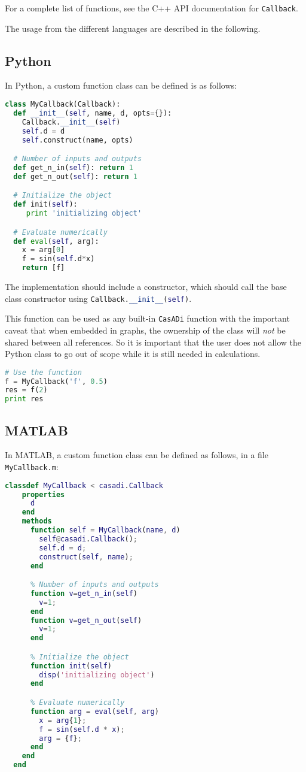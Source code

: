 \documentclass[a4paper,12pt]{book}
\newcommand{\CasADi}{\texttt{CasADi}\xspace}
\begin{document}
For a complete list of functions, see the C++ API documentation for
\texttt{Callback}.

The usage from the different languages are described in the following.

\subsection*{Python}
In Python, a custom function class can be defined is as follows:
\begin{lstlisting}[language=Python]
class MyCallback(Callback):
  def __init__(self, name, d, opts={}):
    Callback.__init__(self)
    self.d = d
    self.construct(name, opts)

  # Number of inputs and outputs
  def get_n_in(self): return 1
  def get_n_out(self): return 1

  # Initialize the object
  def init(self):
     print 'initializing object'

  # Evaluate numerically
  def eval(self, arg):
    x = arg[0]
    f = sin(self.d*x)
    return [f]
\end{lstlisting}

The implementation should include a constructor, which should call the
base class constructor using
\lstinline[language=Python]{Callback.__init__(self)}.

This function can be used as any built-in \CasADi function with the important
caveat that when embedded in graphs, the ownership of the class will \emph{not}
be shared between all references. So it is important that the user does not
allow the Python class to go out of scope while it is still needed in
calculations.

\begin{lstlisting}[language=Python]
# Use the function
f = MyCallback('f', 0.5)
res = f(2)
print res
\end{lstlisting}

\subsection*{MATLAB}
In MATLAB, a custom function class can be defined as follows, in a file
\verb|MyCallback.m|:

\begin{lstlisting}[language=Matlab]
  classdef MyCallback < casadi.Callback
    properties
      d
    end
    methods
      function self = MyCallback(name, d)
        self@casadi.Callback();
        self.d = d;
        construct(self, name);
      end

      % Number of inputs and outputs
      function v=get_n_in(self)
        v=1;
      end
      function v=get_n_out(self)
        v=1;
      end

      % Initialize the object
      function init(self)
        disp('initializing object')
      end

      % Evaluate numerically
      function arg = eval(self, arg)
        x = arg{1};
        f = sin(self.d * x);
        arg = {f};
      end
    end
  end
\end{lstlisting}
\end{document}
